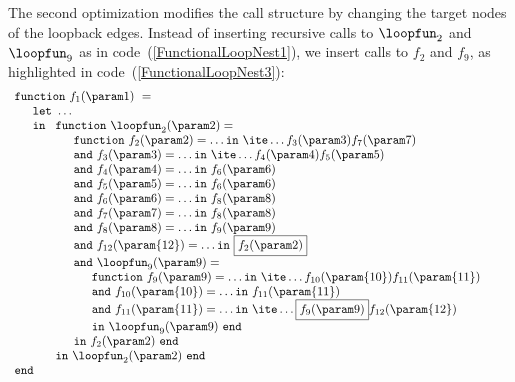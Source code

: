 The second optimization modifies the call structure by changing the
target nodes of the loopback edges. Instead of inserting recursive calls to
$\loopfun_2$ and $\loopfun_9$ as in code~(\ref{FunctionalLoopNest1}),
we insert calls to $f_2$ and $f_9$, as highlighted in
code~(\ref{FunctionalLoopNest3}):
\begin{equation}
\label{FunctionalLoopNest3}
\begin{array}{l}
\mathtt{function}\ f_1(\param 1)\ = \\
  \quad
  \begin{array}{l}
     \mathtt{let}\ \ldots  \\
     \mathtt{in}\ 
     \begin{array}[t]{l}
       \mathtt{function}\ \loopfun_2 (\param 2) =  \\
       \quad \begin{array}[t]{l}
               \mathtt{function}\ f_2(\param 2) = \ldots \mathtt{in}\ \ite \ldots {f_3(\param 3)} {f_7(\param 7)}\\
               \mathtt{and}\ f_3(\param 3) = \ldots \mathtt{in}\ \ite \ldots {f_4(\param 4)} {f_5(\param 5)}\\
               \mathtt{and}\ f_4(\param 4) = \ldots \mathtt{in}\ f_6(\param 6)\\
               \mathtt{and}\ f_5(\param 5) = \ldots \mathtt{in}\ f_6(\param 6)\\
               \mathtt{and}\ f_6(\param 6) = \ldots \mathtt{in}\ f_8(\param 8)\\
               \mathtt{and}\ f_7(\param 7) = \ldots \mathtt{in}\ f_8(\param 8)\\
               \mathtt{and}\ f_8(\param 8) = \ldots \mathtt{in}\ f_9(\param 9)\\
               \mathtt{and}\ f_{12}(\param {12}) = \ldots \mathtt{in}\ \fbox{$f_2(\param 2)$}\\
               \mathtt{and}\ \loopfun_9 (\param 9) =  \\
                    \quad \begin{array}[t]{l}
                             \mathtt{function}\ f_9(\param 9) = \ldots \mathtt{in}\ \ite \ldots {f_{10}(\param {10})} {f_{11}(\param{11})}\\
                             \mathtt{and}\ f_{10}(\param {10}) = \ldots \mathtt{in}\ f_{11}(\param{11})\\
                             \mathtt{and}\ f_{11}(\param {11}) = \ldots \mathtt{in}\ \ite \ldots {\fbox{$f_9(\param 9)$}} {f_{12}(\param{12})}\\
                             \mathtt{in}\ \loopfun_9(\param 9)\ \mathtt{end}
                          \end{array}\\
               \mathtt{in}\ f_2(\param 2)\ \mathtt{end}
             \end{array}\\
       \mathtt{in}\ \loopfun_2(\param 2)\ \mathtt{end}
     \end{array}
  \end{array}\\ 
\mathtt{end}
\end{array} 
\end{equation}
